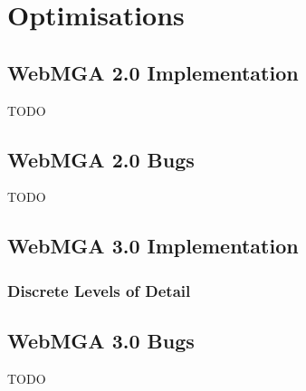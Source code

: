 \section{Optimisations}
\subsection{WebMGA 2.0 Implementation}
TODO

\subsection{WebMGA 2.0 Bugs}
TODO

\subsection{WebMGA 3.0 Implementation}
\subsubsection{Discrete Levels of Detail}

\subsection{WebMGA 3.0 Bugs}
TODO
